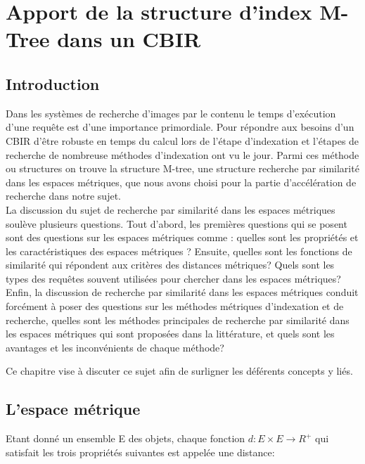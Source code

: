 
\chapter{Apport de la structure d’index M-Tree dans un CBIR} %

\label{Chapter3} %


\section{Introduction}
Dans les systèmes de recherche d'images par le contenu le temps d'exécution d'une requête est d'une importance primordiale. Pour répondre aux besoins d'un CBIR d'être robuste en temps du calcul lors de l'étape d'indexation et l'étapes de recherche de nombreuse méthodes d'indexation ont vu le jour. Parmi ces méthode ou structures on trouve la structure M-tree, une structure recherche par similarité dans les espaces métriques, que nous avons choisi pour la partie d'accélération de recherche dans notre sujet. \\
 
La discussion du sujet de recherche par similarité dans les espaces métriques soulève plusieurs questions. Tout d’abord, les premières questions qui se posent sont des questions sur les espaces métriques comme : quelles sont les propriétés et les caractéristiques des espaces
métriques ? Ensuite, quelles sont les fonctions de similarité qui répondent aux critères des distances métriques? Quels sont les types des requêtes souvent utilisées pour chercher dans les espaces métriques?\\

Enfin, la discussion de recherche par similarité dans les espaces métriques conduit forcément à poser des questions sur les méthodes métriques d’indexation et de recherche, quelles sont les méthodes principales de recherche par similarité dans les espaces métriques
qui sont proposées dans la littérature, et quels sont les avantages et les inconvénients de chaque méthode?

Ce chapitre vise à discuter ce sujet afin de surligner les déférents concepts y liés.
\section{L’espace métrique}
Etant donné un ensemble E des objets, chaque fonction $d: E\times E\rightarrow R^+$ qui satisfait les trois propriétés suivantes est appelée une distance:

